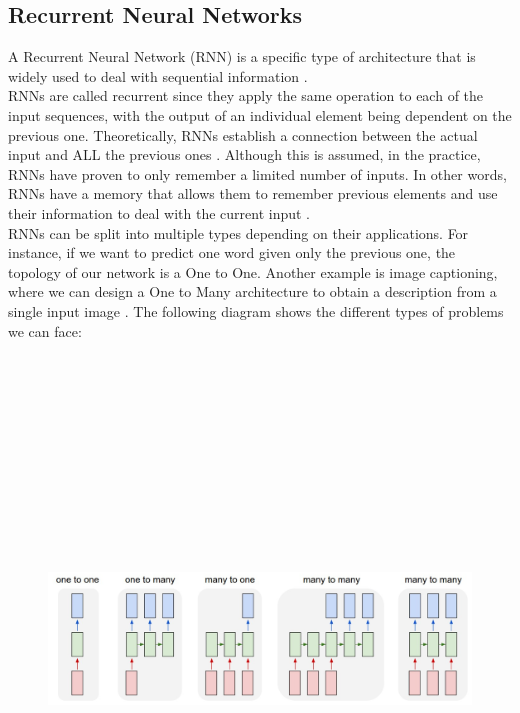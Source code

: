 \documentclass[11pt, a4paper]{article}
\begin{document}
\subsection{Recurrent Neural Networks}
A Recurrent Neural Network (RNN) is a specific type of architecture that is widely used to deal with sequential information \cite{rnns}. \\ \newline \noindent RNNs are called recurrent since they apply the same operation to each of the input sequences, with the output of an individual element being dependent on the previous one. Theoretically, RNNs establish a connection between the actual input and ALL the previous ones \cite{rnns}. Although this is assumed, in the practice, RNNs have proven to only remember a limited number of inputs. In other words, RNNs have a memory that allows them to remember previous elements and use their information to deal with the current input \cite{deeplearning}. \\ \newline \noindent RNNs can be split into multiple types depending on their applications. For instance, if we want to predict one word given only the previous one, the topology of our network is a One to One. Another example is image captioning, where we can design a One to Many architecture to obtain a description from a single input image \cite{rnns}. The following diagram shows the different types of problems we can face: \begin{figure}[H]
    \centering
    \includegraphics[width=15cm,height=15cm,keepaspectratio]{Figures/rnn.png}

\end{figure}
\end{document}
